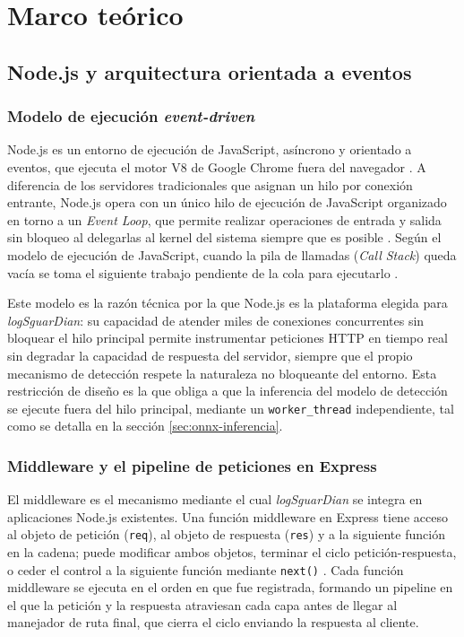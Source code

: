 \chapter{Marco teórico}

\section{Node.js y arquitectura orientada a eventos}

\subsection{Modelo de ejecución \textit{event-driven}}
Node.js es un entorno de ejecución de JavaScript, asíncrono y orientado a eventos, que ejecuta el
motor V8 de Google Chrome fuera del navegador \cite{openjsfoundation2024,nodejs2026intro}. A diferencia de
los servidores tradicionales que asignan un hilo por conexión entrante, Node.js opera con un único hilo de ejecución de JavaScript organizado en torno a un \textit{Event
Loop}, que permite realizar operaciones de entrada y salida sin bloqueo al delegarlas al kernel del
sistema siempre que es posible \cite{nodejs2026eventloop}. Según el modelo de ejecución de
JavaScript, cuando la pila de llamadas (\textit{Call Stack}) queda vacía se toma el siguiente
trabajo pendiente de la cola para ejecutarlo \cite{mdn2026execution}.

Este modelo es la razón técnica por la que Node.js es la plataforma elegida para
\textit{logSguarDian}: su capacidad de atender miles de conexiones concurrentes sin bloquear el
hilo principal permite instrumentar peticiones HTTP en tiempo real sin degradar la capacidad de
respuesta del servidor, siempre que el propio mecanismo de detección respete la naturaleza no
bloqueante del entorno. Esta restricción de diseño es la que obliga a que la inferencia del modelo
de detección se ejecute fuera del hilo principal, mediante un \texttt{worker\_thread} independiente,
tal como se detalla en la sección \ref{sec:onnx-inferencia}.

\subsection{Middleware y el pipeline de peticiones en Express}
El middleware es el mecanismo mediante el cual \textit{logSguarDian} se integra en aplicaciones
Node.js existentes. Una función middleware en Express tiene acceso al objeto de petición
(\texttt{req}), al objeto de respuesta (\texttt{res}) y a la siguiente función en la cadena; puede
modificar ambos objetos, terminar el ciclo petición-respuesta, o ceder el control a la siguiente
función mediante \texttt{next()} \cite{expressjsguide}. Cada función middleware se ejecuta en el
orden en que fue registrada, formando un pipeline en el que la petición y la respuesta atraviesan
cada capa antes de llegar al manejador de ruta final, que cierra el ciclo enviando la respuesta al
cliente.

